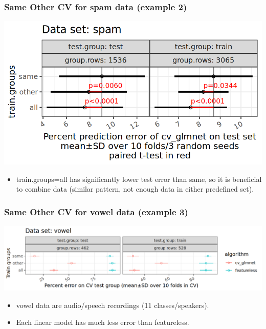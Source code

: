 \documentclass{beamer}
\begin{document}
\begin{frame}
  \frametitle{Same Other CV for spam data (example 2)}
  \includegraphics[width=\textwidth]{spam_error_glmnet_sizes_mean_SD_pvalue.png}
  \begin{itemize}
  \item train.groups=all has significantly
    lower test error than same, so it is beneficial to combine data
    (similar pattern, not enough data in either predefined set).
  \end{itemize}
\end{frame}

\begin{frame}[fragile]
  \frametitle{Same Other CV for vowel data (example 3)}
  \includegraphics[width=\textwidth]{vowel_error_glmnet_featureless_mean_SD.png}
  \begin{itemize}
  \item vowel data are audio/speech recordings (11 classes/speakers).
  \item Each linear model has much less error than featureless.
  \end{itemize}
\end{frame}
\end{document}

